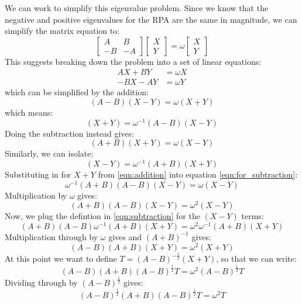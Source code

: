 \documentclass[12pt]{caltech_thesis}
\begin{document}
We can work to simplify this eigenvalue problem. Since we know that the negative and positive eigenvalues for the RPA are the same in magnitude, we can simplify the matrix equation to:
\begin{equation}
\begin{bmatrix}
A & B \\
-B & -A
\end{bmatrix}
\begin{bmatrix}
X \\
Y
\end{bmatrix}
= \omega
\begin{bmatrix}
X \\
Y
\end{bmatrix}
\end{equation}
This suggests breaking down the problem into a set of linear equations:
\begin{align}
    AX + BY &= \omega X\\
    -BX-AY &= \omega Y
\end{align}
which can be simplified by the addition:
\begin{equation}
    (A-B)(X-Y)= \omega (X+Y)
\end{equation}
which means:
\begin{equation}
    (X+Y) = \omega^{-1}(A-B)(X-Y)
\label{eqn:addition}
\end{equation}
Doing the subtraction instead gives:
\begin{equation}
    (A+B)(X+Y)= \omega (X-Y)
\label{eqn:for_subtraction}
\end{equation}
Similarly, we can isolate:
\begin{equation}
    (X-Y) = \omega^{-1}(A+B)(X+Y)
\label{eqn:subtraction}
\end{equation}
Substituting in for $X+Y$ from \ref{eqn:addition} into equation \ref{eqn:for_subtraction}:
\begin{equation}
    \omega^{-1}(A+B)(A-B)(X-Y) = \omega (X-Y)
\end{equation}
Multiplication by $\omega$ gives:
\begin{equation}
    (A+B)(A-B)(X-Y) = \omega^2 (X-Y)
\end{equation}
Now, we plug the defintion in \ref{eqn:subtraction} for the $(X-Y)$ terms:
\begin{equation}
    (A+B)(A-B)\omega^{-1}(A+B)(X+Y) = \omega^2 \omega^{-1}(A+B)(X+Y)
\end{equation}
Multiplication through by $\omega$ gives and $(A+B)^{-1}$ gives:
\begin{equation}
    (A-B)(A+B)(X+Y) = \omega^{2} (X+Y)
\end{equation}
At this point we want to define $T=(A-B)^{-\frac{1}{2}}(X+Y)$, so that we can write:
\begin{equation}
    (A-B)(A+B)(A-B)^{\frac{1}{2}}T = \omega^{2} (A-B)^{\frac{1}{2}}T
\end{equation}
Dividing through by $(A-B)^{\frac{1}{2}}$ gives:
\begin{equation}
    (A-B)^{\frac{1}{2}}(A+B)(A-B)^{\frac{1}{2}}T = \omega^{2} T
\end{equation}
\end{document}
